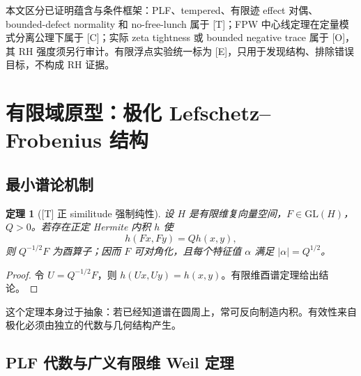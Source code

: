 \documentclass[UTF8,11pt,a4paper]{ctexart}
\newtheorem{theorem}{定理}[section]
\theoremstyle{definition}
\theoremstyle{remark}
\newcommand{\1}{\mathbf 1}
\newcommand{\statusT}{\textnormal{[T]}}
\newcommand{\statusC}{\textnormal{[C]}}
\newcommand{\statusE}{\textnormal{[E]}}
\newcommand{\statusO}{\textnormal{[O]}}
\begin{document}
本文区分已证明蕴含与条件框架：PLF、tempered、有限迹 effect 对偶、bounded-defect normality 和 no-free-lunch 属于 \statusT{}；FPW 中心线定理在定量模式分离公理下属于 \statusC{}；实际 zeta tightness 或 bounded negative trace 属于 \statusO{}，其 RH 强度须另行审计。有限浮点实验统一标为 \statusE{}，只用于发现结构、排除错误目标，不构成 RH 证据。

\section{有限域原型：极化 Lefschetz--Frobenius 结构}

\subsection{最小谱论机制}

\begin{theorem}[\statusT{} 正 similitude 强制纯性]
设 $H$ 是有限维复向量空间，$F\in\mathrm{GL}(H)$，$Q>0$。若存在正定 Hermite 内积 $h$ 使
\[
  h(Fx,Fy)=Qh(x,y),
\]
则 $Q^{-1/2}F$ 为酉算子；因而 $F$ 可对角化，且每个特征值 $\alpha$ 满足 $|\alpha|=Q^{1/2}$。
\end{theorem}

\begin{proof}
令 $U=Q^{-1/2}F$，则 $h(Ux,Uy)=h(x,y)$。有限维酉谱定理给出结论。
\end{proof}

这个定理本身过于抽象：若已经知道谱在圆周上，常可反向制造内积。有效性来自极化必须由独立的代数与几何结构产生。

\subsection{PLF 代数与广义有限维 Weil 定理}
\end{document}
